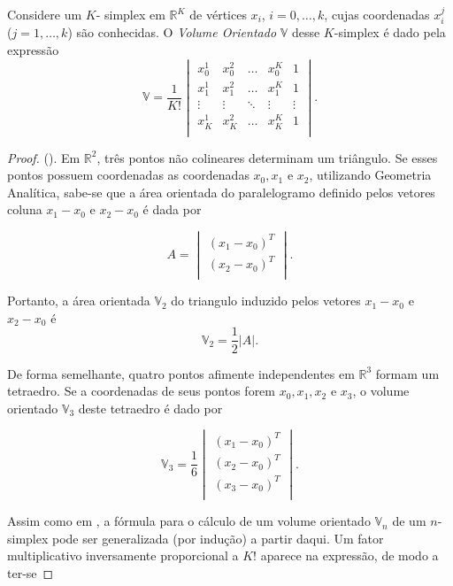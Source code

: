 \begin{lema}
	Considere um $K$- simplex em $\mathbb{R}^K$ de vértices $x_i$, $i = 0,\dots,k$, cujas coordenadas $x_i^j$ ($j = 1,\dots,k$) são conhecidas. O \textit{Volume Orientado} $\mathbb{V}$ desse $K$-simplex é dado pela expressão
	\begin{equation}
		\mathbb{V} = \frac{1}{K!} 
		\begin{vmatrix}
			x_0^1 & x^2_{0} & \ldots & x^K_{0} & 1\\ 
			x^1_{1} & x^2_1 & \ldots & x^K_{1} & 1\\ 
			\vdots & \vdots & \ddots & \vdots & \vdots\\ 
			x^1_{K} & x^2_{K} & \ldots & x_K^K & 1\\ 
		\end{vmatrix}.
		\label{eq:volumeOrientado}
	\end{equation}

	\begin{proof}
		(\cite{douglasGD}). Em $\mathbb{R}^2$, três pontos não colineares determinam um triângulo. Se esses pontos possuem coordenadas as coordenadas $x_0, x_1$ e $x_2$, utilizando Geometria Analítica, sabe-se que a área orientada do paralelogramo definido pelos vetores coluna $x_1-x_0$ e $x_2-x_0$ é dada por
		
		$$ A = \begin{vmatrix}
			(x_1-x_0)^T \\
			(x_2-x_0)^T \\
		\end{vmatrix}.$$
		
		\noindent Portanto, a área orientada $\mathbb{V}_2$ do triangulo induzido pelos vetores $x_1-x_0$ e $x_2-x_0$ é
		$$\mathbb{V}_2 = \frac{1}{2}|A|.$$
		
		\noindent De forma semelhante, quatro pontos afimente independentes em $\mathbb{R}^3$ formam um tetraedro. Se a coordenadas de seus pontos forem $x_0,x_1,x_2$ e $x_3$, o volume orientado $\mathbb{V}_3$ deste tetraedro é dado por 
		
		$$ \mathbb{V}_3 = \frac{1}{6}\begin{vmatrix}
			(x_1-x_0)^T \\
			(x_2-x_0)^T \\
			(x_3-x_0)^T \\
		\end{vmatrix}.$$
		
		\noindent Assim como em \cite{hanson1994geometry}, a fórmula para o cálculo de um volume orientado $\mathbb{V}_n$ de um $n$-simplex pode ser generalizada (por indução) a partir daqui. Um fator multiplicativo inversamente proporcional a $K!$ aparece na expressão, de modo a ter-se
		

\end{proof}
\end{lema}
